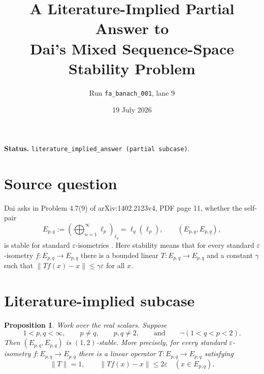 \documentclass[11pt]{article}
\title{A Literature-Implied Partial Answer to\\
Dai's Mixed Sequence-Space Stability Problem}
\author{Run \texttt{fa\_banach\_001}, lane 9}
\date{19 July 2026}
\newtheorem{proposition}{Proposition}
\begin{document}
\maketitle

\noindent\textbf{Status.}
\texttt{literature\_implied\_answer (partial subcase)}.

\section*{Source question}

Dai asks in Problem 4.7(9) of arXiv:1402.2123v4, PDF page 11, whether the
self-pair
\[
 E_{p,q}:=\left(\bigoplus_{n=1}^{\infty}\ell_p\right)_{\ell_q}
          =\ell_q(\ell_p),
 \qquad (E_{p,q},E_{p,q}),
\]
is stable for standard $\varepsilon$-isometries \cite{Dai}.
Here stability means that for every standard $\varepsilon$-isometry
$f:E_{p,q}\to E_{p,q}$ there is a bounded linear $T:E_{p,q}\to E_{p,q}$
and a constant $\gamma$ such that
$\|Tf(x)-x\|\leq\gamma\varepsilon$ for all $x$.

\section*{Literature-implied subcase}

\begin{proposition}
Work over the real scalars.  Suppose
\[
 1<p,q<\infty,\qquad p\ne q,\qquad p,q\ne2,
 \qquad\text{and}\qquad \neg(1<q<p<2).
\]
Then $(E_{p,q},E_{p,q})$ is $(1,2)$-stable.  More precisely, for every
standard $\varepsilon$-isometry $f:E_{p,q}\to E_{p,q}$ there is a linear
operator $T:E_{p,q}\to E_{p,q}$ satisfying
\[
 \|T\|=1,
 \qquad
 \|Tf(x)-x\|\leq2\varepsilon\quad (x\in E_{p,q}).
\]
\end{proposition}
\end{document}
